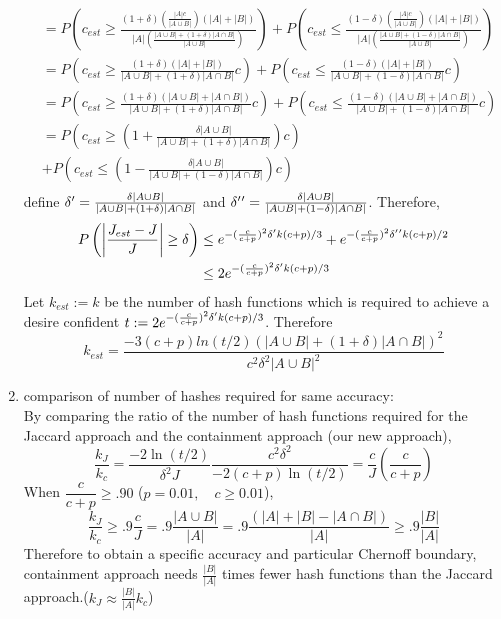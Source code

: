 \documentclass[11pt]{amsart}
\theoremstyle{remark}
\numberwithin{equation}{section}
\begin{document}
\begin{enumerate}
\begin{align*}
&= P\left(c_{est}\geq\frac{ (1+\delta)(\frac{|A|c}{|A\cup B|})(|A|+|B|)}{|A|(\frac{|A\cup B|+(1+\delta)|A \cap B|}{|A\cup B|})} \right)+P\left(c_{est}\leq\frac{ (1-\delta)(\frac{|A|c}{|A\cup B|})(|A|+|B|)}{|A|(\frac{|A\cup B|+(1-\delta)|A \cap B|}{|A\cup B|})} \right)\\
&= P\left(c_{est}\geq\frac{ (1+\delta)(|A|+|B|)}{|A\cup B|+(1+\delta)|A \cap B|} c \right)+P\left(c_{est}\leq\frac{ (1-\delta)(|A|+|B|)}{|A\cup B|+(1-\delta)|A \cap B|} c \right)\\
&= P\left(c_{est}\geq\frac{ (1+\delta)(|A \cup B|+|A \cap B|)}{|A\cup B|+(1+\delta)|A \cap B|} c \right)+P\left(c_{est}\leq\frac{ (1-\delta)(|A \cup B|+|A \cap B|)}{|A\cup B|+(1-\delta)|A \cap B|} c \right)\\
&= P\left(c_{est}\geq\left(1+\frac{\delta |A \cup B|}{|A\cup B|+(1+\delta)|A \cap B|}\right) c \right)\\
&+P\left(c_{est}\leq\left(1-\frac{ \delta |A \cup B|}{|A\cup B|+(1-\delta)|A \cap B|}\right) c \right)\\
\end{align*}
define $\delta\rq{}= \frac{\delta |A \cup B|}{|A\cup B|+(1+\delta)|A \cap B|}$ and $\delta\rq{}\rq{}=\frac{\delta |A \cup B|}{|A\cup B|+(1-\delta)|A \cap B|}$. Therefore,
\begin{align*}
P\left(\left|\frac{J_{est}-J}{J}\right|\geq \delta\right) &\leq e^{-(\frac{c}{c+p})^2\delta\rq{}k(c+p)/3}+e^{-(\frac{c}{c+p})^2\delta\rq{}\rq{}k(c+p)/2}\\
&\leq 2e^{-(\frac{c}{c+p})^2\delta\rq{}k(c+p)/3}
\end{align*}
Let $k_{est}:=k$ be the number of hash functions which is required to achieve a desire confident $t:=2e^{-(\frac{c}{c+p})^2\delta\rq{}k(c+p)/3}$. Therefore
 $$k_{est} =\frac{-3(c+p)ln(t/2)\left(|A\cup B|+(1+\delta)|A\cap B|\right)^2}{c^2\delta^2|A\cup B|^2 } $$
\item comparison of number of hashes required for same accuracy:\\
By comparing the ratio of the number of hash functions required for the Jaccard approach and the containment approach (our new approach), 
$$\dfrac{k_J}{k_c}=\dfrac{-2\ln(t/2)}{\delta^2 J} \dfrac{c^2\delta^2}{-2(c+p)\ln(t/2)}=\dfrac{c}{J}\left(\dfrac{c}{c+p}\right)$$
When $ \dfrac{c}{c+p}\geq.90$ ($p=0.01,\quad c\geq0.01$),
$$\dfrac{k_J}{k_c}\geq .9\frac{c}{J}=.9 \dfrac{|A\cup B|}{|A|}=.9 \dfrac{(|A|+|B|-|A\cap B|)}{|A|}\geq .9 \dfrac{|B|}{|A|}$$
Therefore to obtain a specific accuracy and particular Chernoff boundary, containment approach needs $\frac{|B|}{|A|}$ times fewer hash functions than the Jaccard approach.($k_J \approx\frac{|B|}{|A|}k_c$)\\

\end{enumerate}
\end{document}
